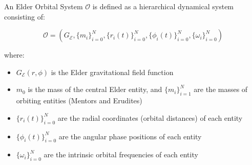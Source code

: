 \begin{definition}
\label{def:elder_orbital_system}
An Elder Orbital System $\mathcal{O}$ is defined as a hierarchical dynamical system consisting of:

\begin{equation}
\mathcal{O} = (G_{\mathcal{E}}, \{m_i\}_{i=0}^N, \{r_i(t)\}_{i=0}^N, \{\phi_i(t)\}_{i=0}^N, \{\omega_i\}_{i=0}^N)
\end{equation}

where:
\begin{itemize}
    \item $G_{\mathcal{E}}(r, \phi)$ is the Elder gravitational field function
    \item $m_0$ is the mass of the central Elder entity, and $\{m_i\}_{i=1}^N$ are the masses of orbiting entities (Mentors and Erudites)
    \item $\{r_i(t)\}_{i=0}^N$ are the radial coordinates (orbital distances) of each entity
    \item $\{\phi_i(t)\}_{i=0}^N$ are the angular phase positions of each entity
    \item $\{\omega_i\}_{i=0}^N$ are the intrinsic orbital frequencies of each entity
\end{itemize}
\end{definition}

